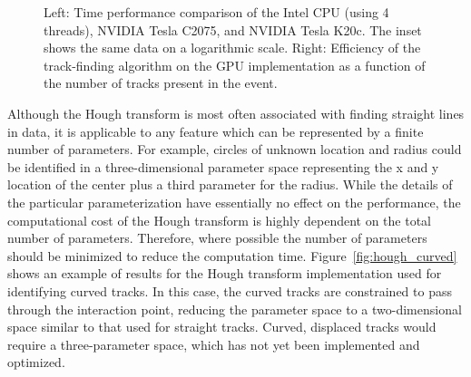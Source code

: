 \documentclass{JINST}
\begin{document}
\begin{figure}[!Hhtb]
\begin{center}
  \caption{Left: Time performance comparison of the Intel CPU (using 4 threads), NVIDIA Tesla C2075, and NVIDIA
    Tesla K20c. The inset shows the same data on a logarithmic scale. Right: Efficiency of the track-finding
    algorithm on the GPU implementation as a function of the number of tracks present in the
    event.}
\end{center}
\end{figure}

Although the Hough transform is most often associated with finding straight lines in data, it is applicable to any feature which can be represented 
by a finite number of parameters.  For example, circles of unknown location and radius could be identified in a three-dimensional parameter 
space representing the x and y location of the center plus a third parameter for the radius.  While the details of the particular parameterization
 have essentially no effect on the performance, the computational cost of the Hough transform is highly dependent on the total number of parameters.
Therefore, where possible the number of parameters should be minimized to reduce the computation time.  Figure~\ref{fig:hough_curved} shows
an example of results for the Hough transform implementation used for identifying curved tracks.  In this case, the
curved tracks are constrained to pass through the interaction point, reducing the parameter space to a two-dimensional space
similar to that used for straight tracks.  Curved, displaced tracks would require a three-parameter space, which has not yet been implemented and optimized.
\end{document}
